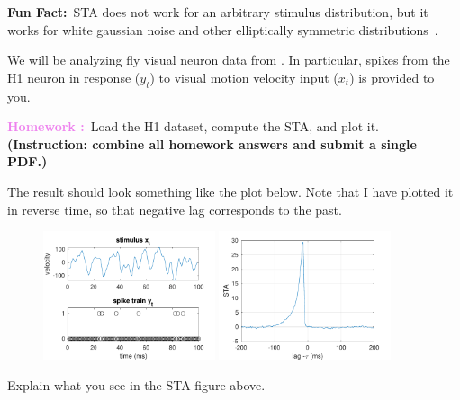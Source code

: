 \documentclass[letterpaper,11pt]{exam}
\newcounter{homework}
\newcommand{\homework}{\stepcounter{homework}\textcolor{violet}{\textbf{Homework \thehomework:}~}}
\newcommand{\funfact}{\textbf{Fun Fact:}~}
\begin{document}
\begin{questions}
\begin{tcolorbox}
    \funfact STA does not work for an arbitrary stimulus distribution, but it works for white gaussian noise and other elliptically symmetric distributions~\cite{Paninski2003,Park2013f}.
\end{tcolorbox}
We will be analyzing fly visual neuron data from \citet{De_Ruyter_van_Steveninck1997}.
In particular, spikes from the H1 neuron in response ($y_t$) to visual motion velocity input ($x_t$) is provided to you.

\question \homework Load the H1 dataset, compute the STA, and plot it.
\textbf{(Instruction: combine all homework answers and submit a single PDF.)}

The result should look something like the plot below.
Note that I have plotted it in reverse time, so that negative lag corresponds to the past.
\begin{figure}[htb]
    \centering
    \includegraphics[width=0.45\textwidth]{data_segment_worksheet}
    \includegraphics[width=0.45\textwidth]{xc_xy}
\end{figure}
\question Explain what you see in the STA figure above.
\end{questions}
\end{document}
